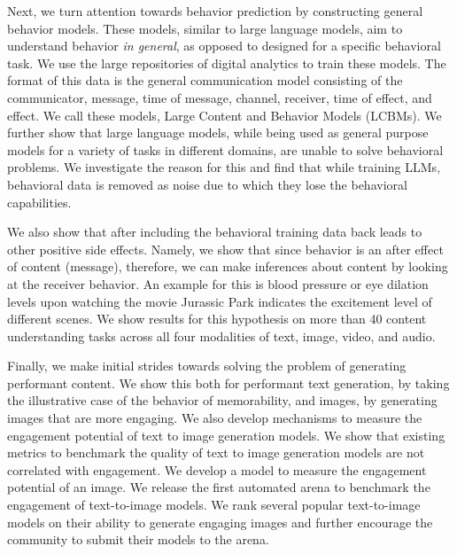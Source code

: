 Next, we turn attention towards behavior prediction by constructing general behavior models. These models, similar to large language models, aim to understand behavior \textit{in general}, as opposed to designed for a specific behavioral task. We use the large repositories of digital analytics to train these models. The format of this data is the general communication model consisting of the communicator, message, time of message, channel, receiver, time of effect, and effect. We call these models, Large Content and Behavior Models (LCBMs). We further show that large language models, while being used as general purpose models for a variety of tasks in different domains, are unable to solve behavioral problems. We investigate the reason for this and find that while training LLMs, behavioral data is removed as noise due to which they lose the behavioral capabilities.


We also show that after including the behavioral training data back leads to other positive side effects. Namely, we show that since behavior is an after effect of content (message), therefore, we can make inferences about content by looking at the receiver behavior. An example for this is blood pressure or eye dilation levels upon watching the movie Jurassic Park indicates the excitement level of different scenes. We show results for this hypothesis on more than 40 content understanding tasks across all four modalities of text, image, video, and audio.


Finally, we make initial strides towards solving the problem of generating performant content. We show this both for performant text generation, by taking the illustrative case of the behavior of memorability, and images, by generating images that are more engaging. We also develop mechanisms to measure the engagement potential of text to image generation models. We show that existing metrics to benchmark the quality of text to image generation models are not correlated with engagement. We develop a model to measure the engagement potential of an image. We release the first automated arena to benchmark the engagement of text-to-image models. We rank several popular text-to-image models on their ability to generate engaging images and further encourage the community to submit their models to the arena.